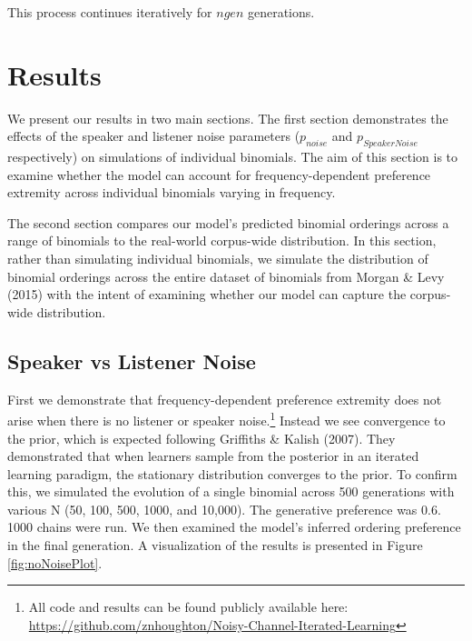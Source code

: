 \documentclass[10pt, letterpaper]{article}
\begin{document}
This process continues iteratively for \(ngen\) generations.

\hypertarget{results}{%
\section{Results}\label{results}}

We present our results in two main sections. The first section
demonstrates the effects of the speaker and listener noise parameters
(\(p_{noise}\) and \(p_{SpeakerNoise}\) respectively) on simulations of
individual binomials. The aim of this section is to examine whether the
model can account for frequency-dependent preference extremity across
individual binomials varying in frequency.

The second section compares our model's predicted binomial orderings
across a range of binomials to the real-world corpus-wide distribution.
In this section, rather than simulating individual binomials, we
simulate the distribution of binomial orderings across the entire
dataset of binomials from Morgan \& Levy (2015) with the intent of
examining whether our model can capture the corpus-wide distribution.

\hypertarget{speaker-vs-listener-noise}{%
\subsection{Speaker vs Listener Noise}\label{speaker-vs-listener-noise}}

First we demonstrate that frequency-dependent preference extremity does
not arise when there is no listener or speaker noise.\footnote{All code
  and results can be found publicly available here:
  \url{https://github.com/znhoughton/Noisy-Channel-Iterated-Learning}}
Instead we see convergence to the prior, which is expected following
Griffiths \& Kalish (2007). They demonstrated that when learners sample
from the posterior in an iterated learning paradigm, the stationary
distribution converges to the prior. To confirm this, we simulated the
evolution of a single binomial across 500 generations with various N
(50, 100, 500, 1000, and 10,000). The generative preference was 0.6.
1000 chains were run. We then examined the model's inferred ordering
preference in the final generation. A visualization of the results is
presented in Figure \ref{fig:noNoisePlot}.
\end{document}
